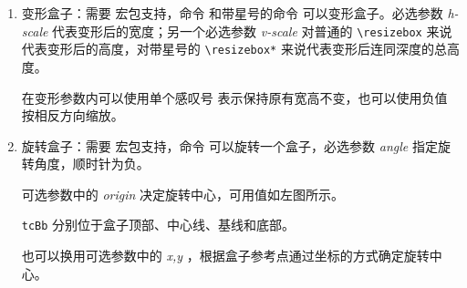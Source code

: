 \begin{enumerate}
\begin{tcolorbox}[sidebyside]
\begin{lstlisting}
\makebox[0pt][l]{mirror$\Omega$}%
\scalebox{1}[-1]{mirror$\Omega$}
\end{lstlisting}

\tcblower
\Large
{}%
\color{gray!50}\scalebox{1}[-1]{mirror$\Omega$}
\end{tcolorbox}

\item 变形盒子：需要  宏包支持，命令  和带星号的命令 \newline {} 可以变形盒子。必选参数 {\ttfamily\itshape h-scale} 代表变形后的宽度；另一个必选参数 {\ttfamily\itshape v-scale} 对普通的 \verb|\resizebox| 来说代表变形后的高度，对带星号的 \verb|\resizebox*| 来说代表变形后连同深度的总高度。

在变形参数内可以使用单个感叹号 \boxforcmd{!} 表示保持原有宽高不变，也可以使用负值按相反方向缩放。

\item 旋转盒子：需要  宏包支持，命令  可以旋转一个盒子，必选参数 {\ttfamily\itshape angle} 指定旋转角度，顺时针为负。

\begin{tcolorbox}[sidebyside, sidebyside align=top, colback=white, lefthand width=0.6\linewidth]
    
    可选参数中的 {\ttfamily\itshape origin} 决定旋转中心，可用值如左图所示。
    
    \vphantom{\Huge Q}\verb|tcBb| 分别位于盒子顶部、中心线、基线和底部。

    \vphantom{\Huge Q}也可以换用可选参数中的 {\ttfamily\itshape x,y} ，根据盒子参考点通过坐标的方式确定旋转中心。
    
    \tcblower
    


\end{tcolorbox}
\end{enumerate}
